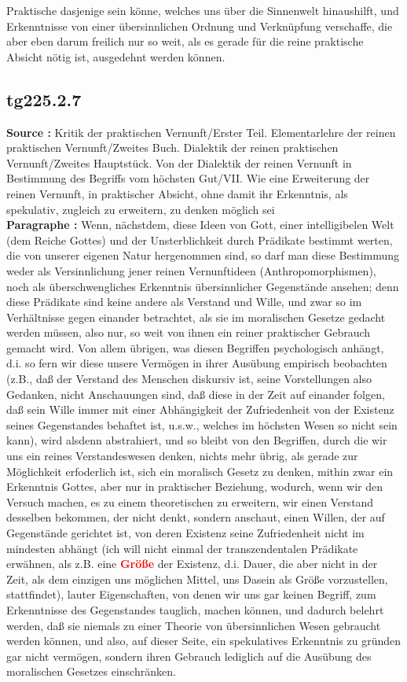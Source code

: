 \documentclass[a4paper,12pt,twoside]{book}
\newcommand{\match}[1]{\textcolor{red}{\textbf{#1}}}
\begin{document}
Praktische dasjenige sein könne, welches uns über die Sinnenwelt hinaushilft, und Erkenntnisse von einer übersinnlichen Ordnung und Verknüpfung verschaffe, die aber eben darum freilich nur so weit, als es gerade für die reine praktische Absicht nötig ist, ausgedehnt werden können. 
	
	\subsection*{tg225.2.7} 
	\textbf{Source : }Kritik der praktischen Vernunft/Erster Teil. Elementarlehre der reinen praktischen Vernunft/Zweites Buch. Dialektik der reinen praktischen Vernunft/Zweites Hauptstück. Von der Dialektik der reinen Vernunft in Bestimmung des Begriffs vom höchsten Gut/VII. Wie eine Erweiterung der reinen Vernunft, in praktischer Absicht, ohne damit ihr Erkenntnis, als spekulativ, zugleich zu erweitern, zu denken möglich sei\\  
	
	\textbf{Paragraphe : }
	Wenn, nächstdem, diese Ideen von Gott, einer intelligibelen Welt (dem Reiche Gottes) und der Unsterblichkeit durch Prädikate bestimmt werten, die von unserer eigenen Natur hergenommen sind, so darf man diese Bestimmung weder als Versinnlichung jener reinen Vernunftideen (Anthropomorphismen), noch als überschwengliches Erkenntnis übersinnlicher Gegenstände ansehen; denn diese Prädikate sind keine andere als Verstand und Wille, und zwar so im Verhältnisse gegen einander betrachtet, als sie im moralischen Gesetze gedacht werden müssen, also nur, so weit von ihnen ein reiner praktischer Gebrauch gemacht wird. Von allem übrigen, was diesen Begriffen psychologisch anhängt, d.i. so fern wir diese unsere Vermögen in ihrer Ausübung empirisch beobachten (z.B., daß der Verstand des Menschen diskursiv ist, seine Vorstellungen also Gedanken, nicht Anschauungen sind, daß diese in der Zeit auf einander folgen, daß sein Wille immer mit einer Abhängigkeit der Zufriedenheit von der Existenz seines Gegenstandes behaftet ist, u.s.w., welches im höchsten Wesen so nicht sein kann), wird alsdenn abstrahiert, und so bleibt von den Begriffen, durch die wir uns ein reines Verstandeswesen denken, nichts mehr übrig, als gerade zur Möglichkeit erfoderlich ist, sich ein moralisch Gesetz zu denken, mithin zwar ein Erkenntnis Gottes, aber nur in praktischer Beziehung, wodurch, wenn wir den Versuch machen, es zu einem theoretischen zu erweitern, wir einen Verstand desselben bekommen, der nicht denkt, sondern anschaut, einen Willen, der auf Gegenstände gerichtet ist, von deren Existenz seine Zufriedenheit nicht im mindesten abhängt (ich will nicht einmal der transzendentalen Prädikate erwähnen, als z.B. eine \match{Größe} der Existenz, d.i. Dauer, die aber nicht in der Zeit, als dem einzigen uns möglichen Mittel, uns Dasein als Größe vorzustellen, stattfindet), lauter Eigenschaften, von denen wir uns gar keinen Begriff, zum Erkenntnisse des Gegenstandes tauglich, machen können, und dadurch belehrt werden, daß sie niemals zu einer Theorie von übersinnlichen Wesen gebraucht werden können, und also, auf dieser Seite, ein spekulatives Erkenntnis zu  gründen gar nicht vermögen, sondern ihren Gebrauch lediglich auf die Ausübung des moralischen Gesetzes einschränken. 
	
\end{document}
